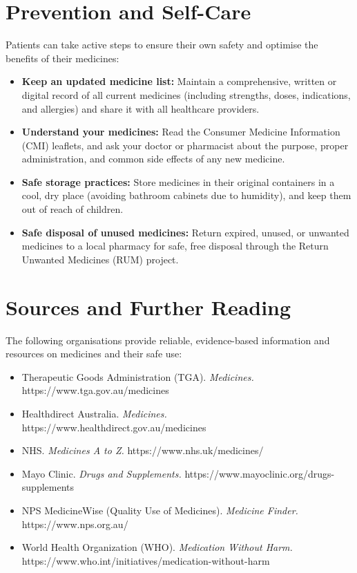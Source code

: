 \section*{Prevention and Self-Care}
Patients can take active steps to ensure their own safety and optimise the benefits of their medicines:
\begin{itemize}
    \item \textbf{Keep an updated medicine list:} Maintain a comprehensive, written or digital record of all current medicines (including strengths, doses, indications, and allergies) and share it with all healthcare providers.
    \item \textbf{Understand your medicines:} Read the Consumer Medicine Information (CMI) leaflets, and ask your doctor or pharmacist about the purpose, proper administration, and common side effects of any new medicine.
    \item \textbf{Safe storage practices:} Store medicines in their original containers in a cool, dry place (avoiding bathroom cabinets due to humidity), and keep them out of reach of children.
    \item \textbf{Safe disposal of unused medicines:} Return expired, unused, or unwanted medicines to a local pharmacy for safe, free disposal through the Return Unwanted Medicines (RUM) project.
\end{itemize}

\section*{Sources and Further Reading}
The following organisations provide reliable, evidence-based information and resources on medicines and their safe use:
\begin{itemize}
    \item Therapeutic Goods Administration (TGA). \textit{Medicines.} https://www.tga.gov.au/medicines
    \item Healthdirect Australia. \textit{Medicines.} https://www.healthdirect.gov.au/medicines
    \item NHS. \textit{Medicines A to Z.} https://www.nhs.uk/medicines/
    \item Mayo Clinic. \textit{Drugs and Supplements.} https://www.mayoclinic.org/drugs-supplements
    \item NPS MedicineWise (Quality Use of Medicines). \textit{Medicine Finder.} https://www.nps.org.au/
    \item World Health Organization (WHO). \textit{Medication Without Harm.} https://www.who.int/initiatives/medication-without-harm
\end{itemize}
